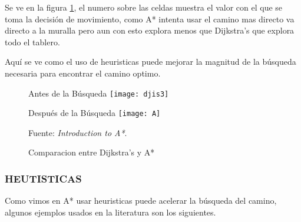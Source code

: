 Se ve en la figura \ref{fig:A}, el numero sobre las celdas muestra el valor con el que se toma la decisión de movimiento, como A* intenta usar el camino mas directo va directo a la muralla pero aun con esto explora menos que Dijkstra's que explora todo el tablero.

Aquí se ve como el uso de heuristicas puede mejorar la magnitud de la búsqueda necesaria para encontrar el camino optimo.

\begin{figure}
\begin{minipage}[c]{0.5\textwidth}
	\centering
    Antes de la Búsqueda
	\texttt{[image: djis3]}
\end{minipage}
\begin{minipage}[c]{0.5\textwidth}
	\centering
    Después de la Búsqueda
	\texttt{[image: A]}
\end{minipage}
\begin{center}
\caption{\label{fig:A} Comparacion entre Dijkstra's y A*} 
Fuente: \textit{Introduction to A*}\cite{Red2016June}.
\end{center}
\end{figure}


\subsubsection{HEUTISTICAS}


Como vimos en A* usar heuristicas puede acelerar la búsqueda del camino, algunos ejemplos usados en la literatura son los siguientes.

